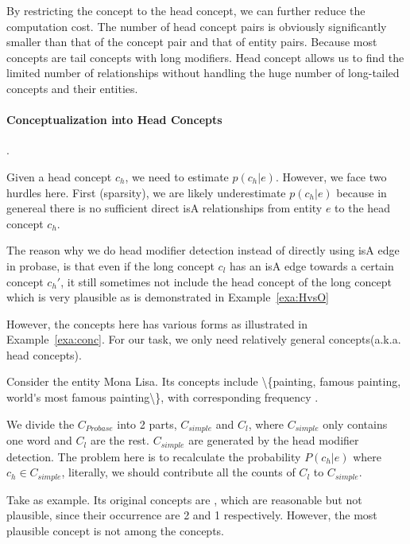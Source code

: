 By restricting the concept to the head concept, we can further reduce the computation cost.
The number of head concept pairs is obviously significantly smaller than that of the concept pair and that of entity pairs. Because most concepts are tail concepts with long modifiers. Head concept allows us to find the limited number of relationships without handling the huge number of long-tailed concepts and their entities. 

\paragraph{Conceptualization into Head Concepts}
.

Given a head concept $c_h$, we need to estimate $p(c_h|e)$. However, we face two hurdles here. First (sparsity), we are likely underestimate $p(c_h|e)$ because in genereal there is no sufficient direct isA relationships from entity $e$ to the head concept $c_h$.


The reason why we do head modifier detection instead of directly using isA edge in probase, is that even if the long concept $c_{l}$ has an isA edge towards a certain concept ${c_h}'$, it still sometimes not include the head concept of the long concept which is very plausible as is demonstrated in Example~\ref{exa:HvsO}


However, the concepts here has various forms as illustrated in Example~\ref{exa:conc}. For our task, we only need relatively general concepts(a.k.a. head concepts).
\begin{example}
\label{exa:conc}
Consider the entity \ac{Mona Lisa}. Its concepts include \ac{\{painting, famous painting, world's most famous painting\}},  with corresponding frequency .
\end{example}

We divide the $C_{Probase}$ into 2 parts, $C_{simple}$ and $C_{l}$, where $C_{simple}$ only contains one word and $C_{l}$ are the rest.
$C_{simple}$ are generated by the head modifier detection. The problem here is to recalculate the probability $P({c_h}|e)$ where ${c_h} \in C_{simple}$, literally, we should contribute all the counts of $C_{l}$ to $C_{simple}$.


\begin{example}
\label{exa:HvsO}
Take  as example. Its original concepts are , which are reasonable but not plausible, since their occurrence are 2 and 1 respectively. However, the most plausible concept  is not among the concepts.
\end{example}


